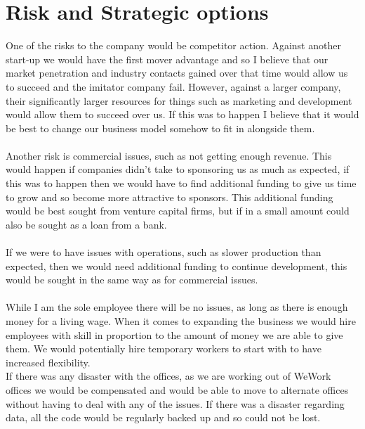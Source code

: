 \documentclass{article}[18pt]
\begin{document}
\section{Risk and Strategic options}
One of the risks to the company would be competitor action. Against another start-up we would have the first mover advantage and so I believe that our market penetration and industry contacts gained over that time would allow us to succeed and the imitator company fail. However, against a larger company, their significantly larger resources for things such as marketing and development would allow them to succeed over us. If this was to happen I believe that it would be best to change our business model somehow to fit in alongside them.\\
\\
Another risk is commercial issues, such as not getting enough revenue. This would happen if companies didn't take to sponsoring us as much as expected, if this was to happen then we would have to find additional funding to give us time to grow and so become more attractive to sponsors. This additional funding would be best sought from venture capital firms, but if in a small amount could also be sought as a loan from a bank.\\
\\
If we were to have issues with operations, such as slower production than expected, then we would need additional funding to continue development, this would be sought in the same way as for commercial issues.\\
\\
While I am the sole employee there will be no issues, as long as there is enough money for a living wage. When it comes to expanding the business we would hire employees with skill in proportion to the amount of money we are able to give them. We would potentially hire temporary workers to start with to have increased flexibility.\\
If there was any disaster with the offices, as we are working out of WeWork offices we would be compensated and would be able to move to alternate offices without having to deal with any of the issues. If there was a disaster regarding data, all the code would be regularly backed up and so could not be lost.
\end{document}

